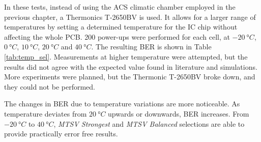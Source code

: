 In these tests, instead of using the ACS climatic chamber employed in the previous chapter, a Thermonics T-2650BV is used. It allows for a larger range of temperatures by setting a determined temperature for the IC chip without affecting the whole PCB. 200 power-ups were performed for each cell, at $\SI{-20}{\degree C}$, $\SI{0}{\degree C}$, $\SI{10}{\degree C}$, $\SI{20}{\degree C}$ and $\SI{40}{\degree C}$. The resulting BER is shown in Table \ref{tab:temp_sel}. Measurements at higher temperature were attempted, but the results did not agree with the expected value found in literature and simulations. More experiments were planned, but the Thermonic T-2650BV broke down, and they could not be performed.





The changes in BER due to temperature variations are more noticeable. As temperature deviates from $\SI{20}{\degree C}$ upwards or downwards, BER increases. From $\SI{-20}{\degree C}$ to $\SI{40}{\degree C}$,  \textit{MTSV Strongest} and \textit{MTSV Balanced} selections are able to provide  practically error free results. 




